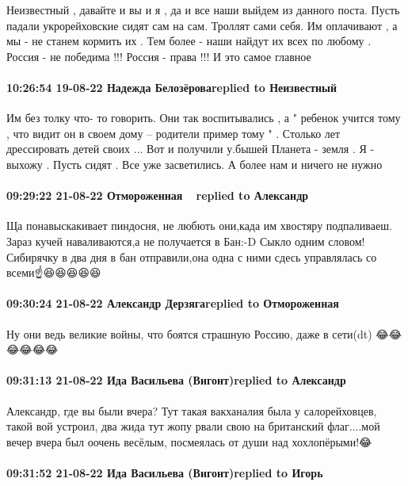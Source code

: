 Неизвестный , давайте и вы и я , да и все наши выйдем из данного поста. Пусть
падали укрорейховские сидят сам на сам. Троллят сами себя. Им оплачивают , а мы
- не станем кормить их . Тем более - наши найдут их всех по любому . Россия -
не победима !!! Россия - права !!! И это самое главное

\paragraph{10:26:54 19-08-22 Надежда Белозёроваreplied to Неизвестный}

Им без толку что- то говорить. Они так воспитывались , а " ребенок учится тому
, что видит он в своем дому -- родители пример тому " . Столько лет
дрессировать детей своих ... Вот и получили у.бышей Планета - земля . Я -
выхожу . Пусть сидят . Все уже засветились. А более нам и ничего не нужно

\paragraph{09:29:22 21-08-22 Отмороженная 🤘🤘🤘replied to Александр}

Ща понавыскакивает пиндосня,
не любють они,када им хвостяру подпаливаеш.
Зараз кучей наваливаются,а не
получается в Бан:-D
Сыкло одним словом!
Сибирячку в два дня в бан отправили,она одна с ними сдесь управлялась со всеми☝️😆😆😆😆😆

\paragraph{09:30:24 21-08-22 Александр Дерзягаreplied to Отмороженная}

Ну они ведь великие войны, что боятся страшную Россию, даже в сети(dt)
😂😂😂😂😂😂


\paragraph{09:31:13 21-08-22 Ида Васильева (Вигонт)replied to Александр}

Александр, где вы были вчера? Тут такая вакханалия была у салорейховцев, такой
вой устроил, два жида тут жопу рвали свою на британский флаг....мой вечер вчера
был оочень весёлым, посмеялась от души над хохлопёрыми!😂

\paragraph{09:31:52 21-08-22 Ида Васильева (Вигонт)replied to Игорь}

